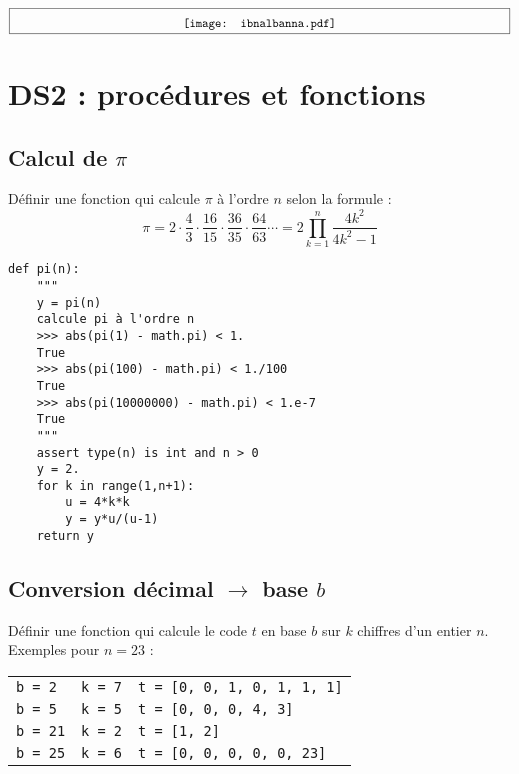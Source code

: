 $$\framebox[14.5cm]{\begin{minipage}{14cm}
$$\texttt{[image: ibnalbanna.pdf]}$$
\end{minipage}}$$ 

\newpage
\section*{DS2 : procédures et fonctions}\label{ds2}

\subsection*{Calcul de $\pi$}
Définir une fonction qui calcule $\pi$ à l'ordre $n$ selon la formule :
	$$\pi = 2\cdot
	\frac{4}{3}\cdot\frac{16}{15}\cdot\frac{36}{35}\cdot\frac{64}{63}\cdots =
	      2\prod_{k=1}^n\frac{4k^2}{4k^2 - 1}$$

{\color{red}
\begin{lstlisting}
def pi(n):
    """
    y = pi(n)
    calcule pi à l'ordre n
    >>> abs(pi(1) - math.pi) < 1.
    True
    >>> abs(pi(100) - math.pi) < 1./100
    True
    >>> abs(pi(10000000) - math.pi) < 1.e-7
    True
    """
    assert type(n) is int and n > 0
    y = 2.
    for k in range(1,n+1):
        u = 4*k*k
        y = y*u/(u-1)
    return y
\end{lstlisting}
}

\subsection*{Conversion décimal $\rightarrow$ base $b$}
Définir une fonction qui calcule le code $t$ en base $b$ sur $k$ chiffres
d'un entier $n$.\\
Exemples pour $n=23$ : 
\begin{tabular}[t]{ll@{\ $\rightarrow$\ }l}
{\tt b = 2}  & {\tt k = 7} & {\tt t = [0, 0, 1, 0, 1, 1, 1]}\\
{\tt b = 5}  & {\tt k = 5} & {\tt t = [0, 0, 0, 4, 3]}\\
{\tt b = 21} & {\tt k = 2} & {\tt t = [1, 2]}\\
{\tt b = 25} & {\tt k = 6} & {\tt t = [0, 0, 0, 0, 0, 23]}
\end{tabular}

